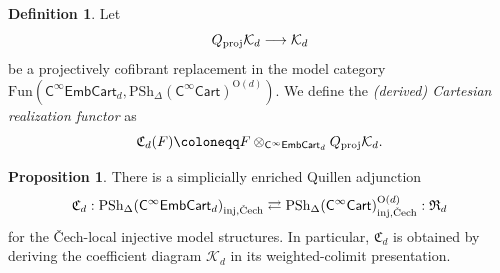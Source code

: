 \documentclass{amsart}
\newcommand{\cat}[1]{\mathsf{#1}}
\newcommand{\proj}{\textnormal{proj}}
\newcommand{\Cech}{\textnormal{\v{C}ech}}
\newcommand{\Cart}{\cat{C}^{\infty}\cat{Cart}}
\newcommand{\fembcartnoniso}[1]{\cat{C}^{\infty}\cat{EmbCart}_{#1}}
\newcommand{\Fun}{\mathrm{Fun}}
\newcommand{\spsh}{\mathrm{PSh}_{\Delta}}
\newcommand{\Cc}{\mathfrak{C}}
\theoremstyle{definition}
\newtheorem{definition}[equation]{Definition}
\newtheorem{proposition}[equation]{Proposition}
\numberwithin{equation}{subsection}
\numberwithin{subsubsection}{subsection}
\begin{document}
\begin{definition}\label{def:Cartesian.realization.functor}
  Let
  \[
    Q_{\proj}\mathcal{K}_d
    \longrightarrow
    \mathcal{K}_d
  \]
  be a projectively cofibrant replacement in the model category
  \(\Fun(\fembcartnoniso{d},\spsh(\Cart)^{\mathrm{O}(d)})\).
  We define the \emph{(derived) Cartesian realization functor} as
  \[
    \Cc_d(F)
    \coloneqq
    F\otimes_{\fembcartnoniso{d}}Q_{\proj}\mathcal{K}_d.
  \]
\end{definition}

\begin{proposition}\label{prop:Cartesian.realization.Quillen.adjunction}
  There is a simplicially enriched Quillen adjunction
  \begin{equation}\label{eq:Cartesian.realization.adjunction}
    \Cc_d : \spsh(\fembcartnoniso{d})_{\mathrm{inj},\Cech} \rightleftarrows
    \spsh(\Cart)_{\mathrm{inj},\Cech}^{\mathrm{O}(d)} : \mathfrak{R}_{d}
  \end{equation}
  for the \v{C}ech-local injective model structures. In particular, \(\Cc_d\)
  is obtained by deriving the coefficient diagram \(\mathcal{K}_d\) in its
  weighted-colimit presentation.
\end{proposition}
\end{document}
